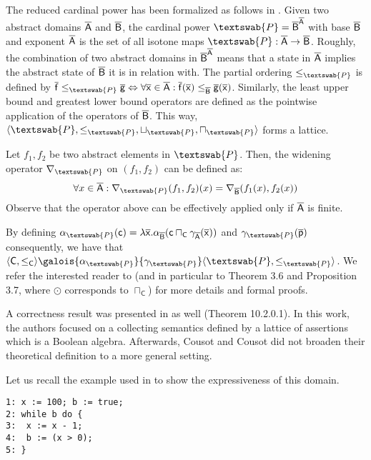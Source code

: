 \documentclass[submission,copyright,creativecommons]{eptcs}
\newcommand{\funzione}[2]{\ensuremath{#1 \rightarrow#2}}
\newcommand{\cset}[1]{\ensuremath{\mathsf{#1}}}
\newcommand{\cel}[1]{\ensuremath{\mathsf{#1}}}
\newcommand{\ael}[1]{\cel{\overline{#1}}}
\newcommand{\firstdomain}{\aset{A}}
\newcommand{\seconddomain}{\aset{B}}
\newcommand{\concretedomain}{\cset{C}}
\newcommand{\powerdomain}{\textswab{P}}
\begin{document}
The reduced cardinal power has been formalized as follows in \cite{CC79}. Given two abstract domains $\firstdomain$ and $\seconddomain$, the cardinal power $\powerdomain=\seconddomain^{\firstdomain}$ with base $\seconddomain$ and exponent $\firstdomain$ is the set of all isotone maps $\powerdomain : \funzione{\firstdomain}{\seconddomain}$. Roughly, the combination of two abstract domains in $\seconddomain^{\firstdomain}$ means that a state in $\firstdomain$ implies the abstract state of $\seconddomain$ it is in relation with. The partial ordering $\leq_\powerdomain$ is defined by $\ael{f} \leq_\powerdomain \ael{g} \Leftrightarrow \forall \ael{x} \in \firstdomain : \ael{f}(\ael{x}) \leq_\seconddomain \ael{g}(\ael{x})$. Similarly, the least upper bound and greatest lower bound operators are defined as the pointwise application of the operators of $\seconddomain$. This way, $\langle \powerdomain, \leq_\powerdomain, \sqcup_\powerdomain, \sqcap_\powerdomain \rangle$ forms a lattice.

Let $f_1,f_2$ be two abstract elements in $\powerdomain$. Then, the widening operator $\nabla_{\powerdomain}$ on $(f_1,f_2)$ can be defined as:
$$\forall x \in \firstdomain : \nabla_{\powerdomain}(f_1,f_2)(x) = \nabla_{\seconddomain}(f_1(x),f_2(x))$$
Observe that the operator above can be effectively applied only if $\firstdomain$ is finite.

By defining $\alpha_\powerdomain(\cel{c}) = \lambda \ael{x} . \alpha_\seconddomain(\cel{c} \sqcap_\concretedomain \gamma_\firstdomain(\ael{x}))$ and $\gamma_\powerdomain(\ael{p})$ consequently, we have that $\langle \concretedomain, \leq_\concretedomain \rangle \galois{\alpha_\powerdomain}{\gamma_\powerdomain} \langle \powerdomain, \leq_\powerdomain \rangle$. We refer the interested reader to \cite{GR99} (and in particular to Theorem 3.6 and Proposition 3.7, where $\odot$ corresponds to $\sqcap_\concretedomain$) for more details and formal proofs.



A correctness result was presented in \cite{CC79} as well (Theorem 10.2.0.1). In this work, the authors focused on a collecting semantics defined by a lattice of assertions which is a Boolean algebra. Afterwards, Cousot and Cousot did not broaden their theoretical definition to a more general setting.

Let us recall the example used in \cite{CC79} to show the expressiveness of this domain.

\lstset{numbers=none}
\begin{lstlisting}
1: x := 100; b := true;
2: while b do {
3: 	x := x - 1;
4: 	b := (x > 0);
5: }
\end{lstlisting} 
\end{document}
